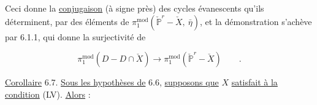 \begin{center}
\end{center}
Ceci donne la \underline{conjugaison} (à signe près) des cycles évanescents qu'ils déterminent, par des éléments de $\pi_{1}^{\mathrm{mod}}(\check{\mathbb{P}}^{r} - \check{X},\ \bar{\eta})$, et la démonstration s'achève par 6.1.1, qui donne la surjectivité de

\begin{equation*}
\pi_{1}^{\mathrm{mod}}(D - D \cap \check{X}) \longrightarrow \pi_{1}^{\mathrm{mod}}(\check{\mathbb{P}}^{r} - \check{X}) \qquad .
\end{equation*}


\underline{Corollaire} 6.7. \underline{Sous les hypothèses de} 6.6, \underline{supposons que} $X$ \underline{satisfait à la condition} (LV). \underline{Alors} :

